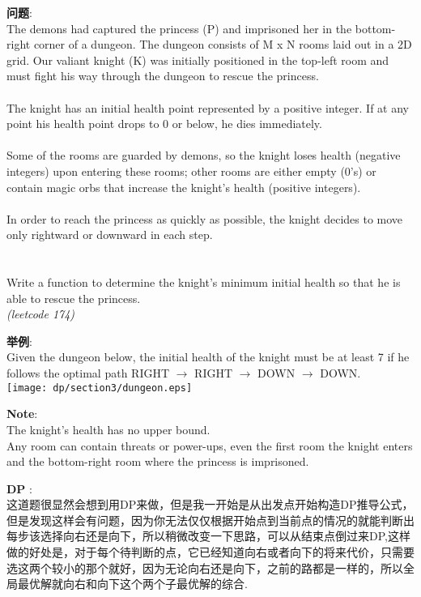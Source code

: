     
\begin{description}
    \item{\textbf{问题}}:\\
The demons had captured the princess (P) and imprisoned her in the bottom-right corner of a dungeon. The dungeon consists of M x N rooms laid out in a 2D grid. Our valiant knight (K) was initially positioned in the top-left room and must fight his way through the dungeon to rescue the princess. \\
\\
The knight has an initial health point represented by a positive integer. If at any point his health point drops to 0 or below, he dies immediately. \\
\\
Some of the rooms are guarded by demons, so the knight loses health (negative integers) upon entering these rooms; other rooms are either empty (0's) or contain magic orbs that increase the knight's health (positive integers). \\
\\
In order to reach the princess as quickly as possible, the knight decides to move only rightward or downward in each step. \\
\\
\\
Write a function to determine the knight's minimum initial health so that he is able to rescue the princess. \\
\textit{(leetcode 174)}
    \item{\textbf{举例}}:\\
Given the dungeon below, the initial health of the knight must be at least 7 if he follows the optimal path RIGHT $\rightarrow$ RIGHT $\rightarrow$ DOWN $\rightarrow$ DOWN. \\
\texttt{[image: dp/section3/dungeon.eps]} 
    \item{\textbf{Note}}:\\
The knight's health has no upper bound. \\
Any room can contain threats or power-ups, even the first room the knight enters and the bottom-right room where the princess is imprisoned. \\
    \item{\textbf{DP}} : 
    \\这道题很显然会想到用DP来做，但是我一开始是从出发点开始构造DP推导公式，但是发现这样会有问题，因为你无法仅仅根据开始点到当前点的情况的就能判断出每步该选择向右还是向下，所以稍微改变一下思路，可以从结束点倒过来DP,这样做的好处是，对于每个待判断的点，它已经知道向右或者向下的将来代价，只需要选这两个较小的那个就好，因为无论向右还是向下，之前的路都是一样的，所以全局最优解就向右和向下这个两个子最优解的综合.

\end{description}
